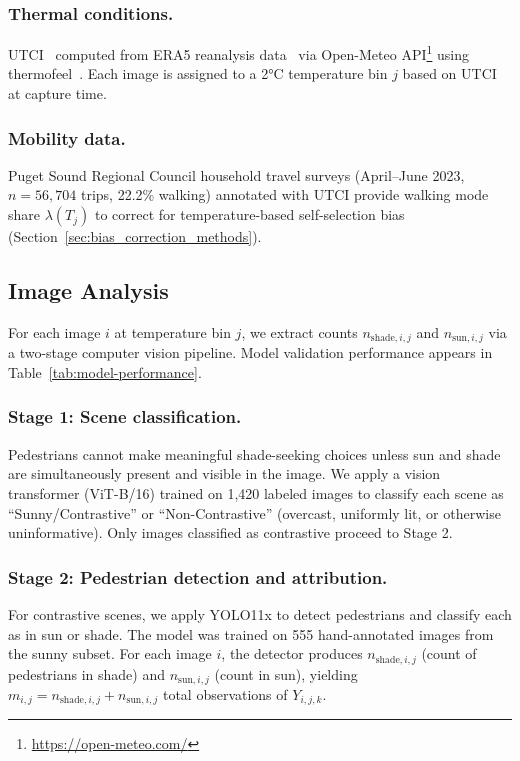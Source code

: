 \documentclass{ifacconf}
\begin{document}
    \subsubsection{Thermal conditions.} UTCI~\citep{Brde2012DerivingTO} computed from ERA5 reanalysis data~\citep{hersbach2020era5}
  via Open-Meteo API\footnote{\url{https://open-meteo.com/}} using thermofeel~\citep{Brimicombe2022ThermofeelAP}. Each image is
  assigned to a 2°C temperature bin $j$ based on UTCI at capture time.

    \subsubsection{Mobility data.} Puget Sound Regional Council household travel surveys (April--June 2023, $n=56,704$ trips, 22.2\%
  walking) annotated with UTCI provide walking mode share $\lambda(T_j)$ to correct for temperature-based self-selection bias
  (Section~\ref{sec:bias_correction_methods}).

  \subsection{Image Analysis}
  \label{subsec:image_analysis}

  For each image $i$ at temperature bin $j$, we extract counts $n_{\text{shade},i,j}$ and $n_{\text{sun},i,j}$ via a two-stage computer vision pipeline. Model validation performance appears in Table~\ref{tab:model-performance}.

  \subsubsection{Stage 1: Scene classification.}
  Pedestrians cannot make meaningful shade-seeking choices unless sun and shade are simultaneously present and visible in the image.
  We apply a vision transformer (ViT-B/16) trained on 1,420 labeled images to classify each scene as ``Sunny/Contrastive'' or
  ``Non-Contrastive'' (overcast, uniformly lit, or otherwise uninformative). Only images classified as contrastive proceed to Stage
  2.

  \subsubsection{Stage 2: Pedestrian detection and attribution.}
  For contrastive scenes, we apply YOLO11x to detect pedestrians and classify each as in sun or shade. The model was trained on 555
  hand-annotated images from the sunny subset. For each image $i$, the detector produces $n_{\text{shade},i,j}$ (count of pedestrians
  in shade) and $n_{\text{sun},i,j}$ (count in sun), yielding $m_{i,j} = n_{\text{shade},i,j} + n_{\text{sun},i,j}$ total observations of
   $Y_{i,j,k}$.
\end{document}
